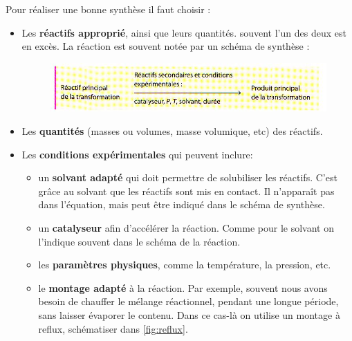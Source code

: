 \documentclass[11pt,a4paper]{article}
\begin{document}
Pour réaliser une bonne synthèse il faut choisir : 
\begin{itemize}
    \item Les \textbf{réactifs approprié}, ainsi que leurs quantités. souvent l’un des deux est en excès. La réaction est souvent notée par un schéma de synthèse : 
    
    \begin{figure}[h]
    \centering
    \includegraphics[width=0.95\linewidth]{imgs/c5/syntheseRW.jpg}
\end{figure}

    \item Les \textbf{quantités} (masses ou volumes, masse volumique, etc) des réactifs.
    \item Les \textbf{conditions expérimentales} qui peuvent inclure:
    \begin{itemize}
        \item un \textbf{solvant adapté} qui doit permettre de solubiliser les réactifs. C’est grâce au solvant que les réactifs sont mis en contact. Il n’apparaît pas dans l’équation, mais peut être indiqué dans le schéma de synthèse. 
        \item un \textbf{catalyseur} afin d’accélérer la réaction. Comme pour le solvant on l’indique souvent dans le schéma de la réaction.
        \item les \textbf{paramètres physiques}, comme la température, la pression, etc. \item le \textbf{montage adapté} à la réaction. Par exemple, souvent nous avons besoin de chauffer le mélange réactionnel, pendant une longue période, sans laisser évaporer le contenu. Dans ce cas-là on utilise un montage à reflux, schématiser dans \ref{fig:reflux}. 
    \end{itemize}
\end{itemize}
\end{document}

